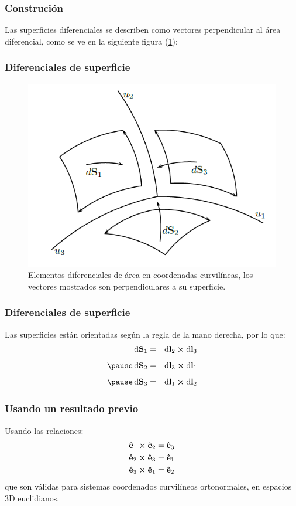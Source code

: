 \documentclass[12pt]{beamer}
\begin{document}
\begin{frame}
\frametitle{Construción}
Las superficies diferenciales se describen como vectores perpendicular al área diferencial, como se ve en la siguiente figura (\ref{fig:figura_diferenciales_superficie}):
\end{frame}
\begin{frame}
\frametitle{Diferenciales de superficie}
\begin{figure}[h!]
    \centering
    \includegraphics[scale=0.5]{Imagenes/Diferenciales_Superficie_01.png}
    \caption{Elementos diferenciales de área en coordenadas curvilíneas, los vectores mostrados son perpendiculares a su superficie.}
    \label{fig:figura_diferenciales_superficie}
\end{figure}
\end{frame}
\begin{frame}
\frametitle{Diferenciales de superficie}
Las superficies están orientadas según la regla de la mano derecha, por lo que:
\pause
\begin{eqnarray*}
\dd{\vb{S}_{1}} &=& \dd{\vb{l}_{2}} \cp \dd{\vb{l}_{3}} \\[0.5em] \pause
\dd{\vb{S}_{2}} &=& \dd{\vb{l}_{3}} \cp \dd{\vb{l}_{1}} \\[0.5em] \pause
\dd{\vb{S}_{3}} &=& \dd{\vb{l}_{1}} \cp \dd{\vb{l}_{2}}
\end{eqnarray*}
\end{frame}
\begin{frame}
\frametitle{Usando un resultado previo}
Usando las relaciones:
\pause
\begin{align*}
\vu{e}_{1} \cp \vu{e}_{2} = \vu{e}_{3} \\
\vu{e}_{2} \cp \vu{e}_{3} = \vu{e}_{1} \\
\vu{e}_{3} \cp \vu{e}_{1} = \vu{e}_{2}
\end{align*}
que son válidas para sistemas coordenados curvilíneos ortonormales, en espacios 3D euclidianos.
\end{frame}
\end{document}
